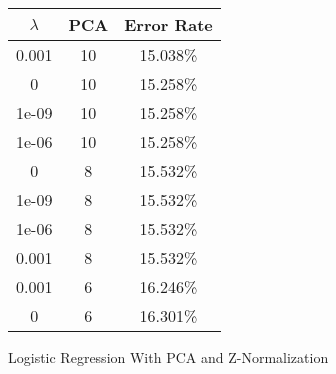 \begin{center}
\begin{tabular}{|c|c|c|}
\hline
$\lambda$ & PCA & Error Rate \\
\hline
0.001 & 10 & 15.038\% \\
\hline
0 & 10 & 15.258\% \\
\hline
1e-09 & 10 & 15.258\% \\
\hline
1e-06 & 10 & 15.258\% \\
\hline
0 & 8 & 15.532\% \\
\hline
1e-09 & 8 & 15.532\% \\
\hline
1e-06 & 8 & 15.532\% \\
\hline
0.001 & 8 & 15.532\% \\
\hline
0.001 & 6 & 16.246\% \\
\hline
0 & 6 & 16.301\% \\
\hline
\end{tabular}
\end{center}
\caption{Logistic Regression With PCA and Z-Normalization}\label{tab:logreg_pcan_acctable}
